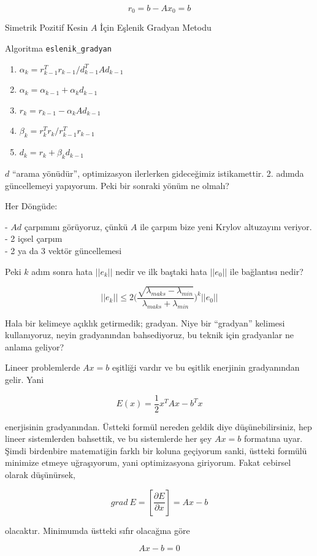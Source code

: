 \documentclass[12pt,fleqn]{article}\usepackage{../../common}
\begin{document}
$$ r_0 = b - Ax_0  = b$$

Simetrik Pozitif Kesin $A$ İçin Eşlenik Gradyan Metodu

Algoritma \verb!eslenik_gradyan!
\begin{enumerate}
  \item $\alpha_k = r_{k-1}^T r_{k-1} / d_{k-1}^T A d_{k-1}$ 
  \item $\alpha_k = \alpha_{k-1} + \alpha_k d_{k-1}$
  \item $r_k = r_{k-1} - \alpha_k Ad_{k-1}$
  \item $\beta_k = r_k^Tr_k / r_{k-1}^Tr_{k-1}$
  \item $d_k = r_k + \beta_k d_{k-1}$
\end{enumerate}

$d$ ``arama yönüdür'', optimizasyon ilerlerken gideceğimiz
istikamettir. 2. adımda güncellemeyi yapıyorum. Peki bir sonraki yönüm ne
olmalı?

Her Döngüde:

- $Ad$ çarpımını görüyoruz, çünkü $A$ ile çarpım bize yeni Krylov altuzayını
veriyor.\\
- 2 içsel çarpım \\
- 2 ya da 3 vektör güncellemesi

Peki $k$ adım sonra hata $||e_k||$ nedir ve ilk baştaki hata $||e_0||$ ile
bağlantısı nedir? 

$$ ||e_k|| \le 2  \bigg(
\frac{ \sqrt{ \lambda_{maks} - \lambda_{min}}}
{\lambda_{maks} + \lambda_{min}}
\bigg)^k||e_0||
$$

Hala bir kelimeye açıklık getirmedik; gradyan. Niye bir ``gradyan''
kelimesi kullanıyoruz, neyin gradyanından bahsediyoruz, bu teknik için
gradyanlar ne anlama geliyor?

Lineer problemlerde $Ax = b$ eşitliği vardır ve bu eşitlik enerjinin
gradyanından gelir. Yani 

$$ E(x) = \frac{ 1}{2}x^TAx - b^Tx $$

enerjisinin gradyanından. Üstteki formül nereden geldik diye
düşünebilirsiniz, hep lineer sistemlerden bahsettik, ve bu sistemlerde her
şey $Ax = b$ formatına uyar. Şimdi birdenbire matematiğin farklı bir koluna
geçiyorum sanki, üstteki formülü minimize etmeye uğraşıyorum, yani
optimizasyona giriyorum. Fakat cebirsel olarak düşünürsek, 

$$ grad \ E = [\frac{\partial E}{\partial x} ]  = Ax - b $$

olacaktır. Minimumda üstteki sıfır olacağına göre 

$$ Ax - b = 0 $$
\end{document}
